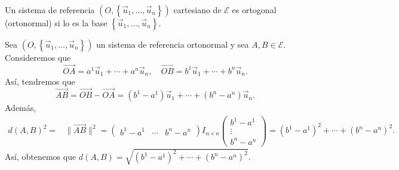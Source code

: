 \begin{fdefinition}[]
	\normalfont Un sistema de referencia $\displaystyle \left(O, \left\{ \vec{u}_{1}, \ldots, \vec{u}_{n}\right\} \right) $ cartesiano de $\displaystyle \mathcal{E} $ es ortogonal (ortonormal) si lo es la base $\displaystyle \left\{ \vec{u}_{1}, \ldots, \vec{u}_{n}\right\}  $.
\end{fdefinition}
\begin{observation}
\normalfont Sea $\displaystyle \left(O, \left\{ \vec{u}_{1}, \ldots, \vec{u}_{n}\right\} \right) $ un sistema de referencia ortonormal y sea $\displaystyle A,B \in \mathcal{E} $. Consideremos que 
\[\overrightarrow{OA} = a^{1}\vec{u}_{1} + \cdots + a^{n}\vec{u}_{n}, \quad \overrightarrow{OB} = b^{1}\vec{u}_{1} + \cdots + b^{n}\vec{u}_{n} .\]
Así, tendremos que 
\[\overrightarrow{AB} = \overrightarrow{OB}-\overrightarrow{OA} = \left(b^{1}-a^{1}\right)\vec{u}_{1} + \cdots + \left(b^{n}-a^{n}\right)\vec{u}_{n} .\]
Además, 
\[
\begin{split}
	d\left(A,B\right)^{2} = & \|\overrightarrow{AB}\|^{2} = \begin{pmatrix} b^{1}-a^{1} & \cdots & b^{n}-a^{n} \end{pmatrix} I_{n \times n}\begin{pmatrix} b^{1}-a^{1} \\ \vdots \\ b^{n}-a^{n} \end{pmatrix} = \left(b^{1}-a^{1}\right)^{2} + \cdots + \left(b^{n}-a^{n}\right)^{2}.
\end{split}
\]
Así, obtenemos que $\displaystyle d\left(A,B\right) = \sqrt{\left(b^{1}-a^{1}\right)^{2} + \cdots + \left(b^{n}-a^{n}\right)^{2}} $.
\end{observation}
